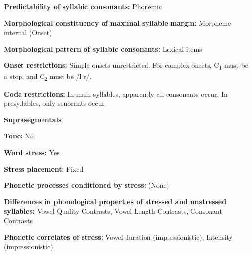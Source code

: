 \begin{styleBody}
\textbf{Predictability of syllabic consonants:} Phonemic
\end{styleBody}

\begin{styleBody}
\textbf{Morphological constituency of maximal syllable margin:} Morpheme-internal (Onset)
\end{styleBody}

\begin{styleBody}
\textbf{Morphological pattern of syllabic consonants:} Lexical items
\end{styleBody}

\begin{styleBody}
\textbf{Onset restrictions: }Simple onsets unrestricted. For complex onsets, C\textsubscript{1} must be a stop, and C\textsubscript{2} must be /l r/. 
\end{styleBody}

\begin{styleBody}
\textbf{Coda restrictions: }In main syllables, apparently all consonants occur. In presyllables, only sonorants occur.
\end{styleBody}

\begin{styleBody}
\textbf{Suprasegmentals}
\end{styleBody}

\begin{styleBody}
\textbf{Tone:} No
\end{styleBody}

\begin{styleBody}
\textbf{Word stress:} Yes
\end{styleBody}

\begin{styleBody}
\textbf{Stress placement:} Fixed
\end{styleBody}

\begin{styleBody}
\textbf{Phonetic processes conditioned by stress:} (None)
\end{styleBody}

\begin{styleBody}
\textbf{Differences in phonological properties of stressed and unstressed syllables:} Vowel Quality Contrasts, Vowel Length Contrasts, Consonant Contrasts
\end{styleBody}

\begin{styleBody}
\textbf{Phonetic correlates of stress: }Vowel duration (impressionistic), Intensity (impressionistic)
\end{styleBody}


